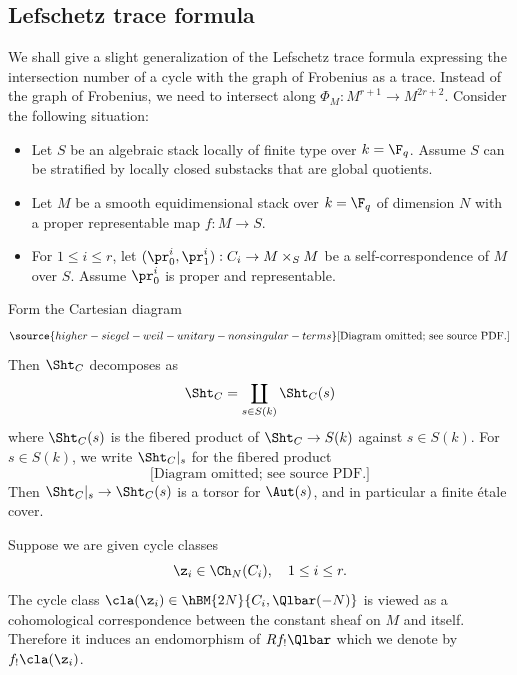 \subsection{Lefschetz trace formula}
We shall give a slight generalization of the Lefschetz trace formula \cite[Proposition A.12]{YZ} expressing the intersection number of a cycle with the graph of Frobenius as a trace. Instead of the graph of Frobenius, we need to intersect along $\Phi_{M}:M^{r+1}\to M^{2r+2}$. Consider the following situation:
\begin{itemize}
\item Let $S$ be an algebraic stack locally of finite type over $k=\F_q$. Assume $S$ can be stratified by locally closed substacks that are global quotients.
\item Let $M$ be a smooth equidimensional stack over $k=\F_q$ of dimension $N$ with a proper representable map $f: M\to S$.
\item For $1\le i\le r$,  let $(\pr^{i}_{0},\pr^{i}_{1}): C_{i}\to M\times_{S}M$ be a self-correspondence of $M$ over $S$. Assume $\pr^{i}_{0}$ is proper and representable.
\end{itemize}
Form the Cartesian diagram
\begin{equation}\label{ShtC}
\source{higher-siegel-weil-unitary-nonsingular-terms}
\text{[Diagram omitted; see source PDF.]}
\end{equation}
Then $\Sht_{C}$ decomposes as
\begin{equation}
\Sht_{C}=\coprod_{s\in S(k)}\Sht_{C}(s)
\end{equation}
where $\Sht_C(s)$ is the fibered product of $\Sht_C \rightarrow S(k)$ against $s \in S(k)$. For $s \in S(k)$, we write $\Sht_{C}|_s$ for the fibered product
\[
\text{[Diagram omitted; see source PDF.]}
\]
Then $\Sht_C|_s \rightarrow \Sht_C(s)$ is a torsor for $\Aut(s)$, and in particular a finite \'{e}tale cover.

Suppose we are given cycle classes
\begin{equation}
\z_{i}\in \Ch_{N}(C_{i}), \quad 1\le i\le r.
\end{equation}
The cycle class  $\cla(\z_{i})\in \hBM{2N}{C_{i},\Qlbar(-N)}$ is viewed as a cohomological correspondence between the constant sheaf on $M$ and itself. Therefore it induces an endomorphism of $Rf_{!}\Qlbar$ which we denote by $f_{!}\cla(\z_{i})$.

